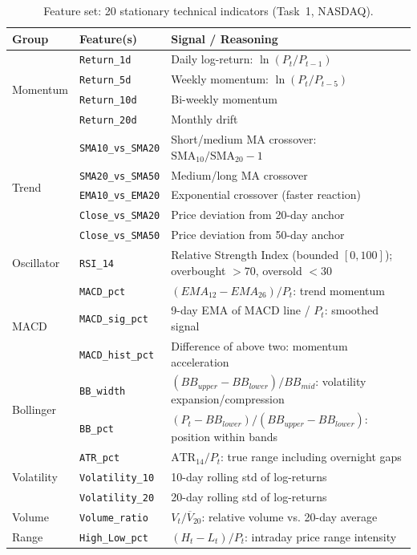 \documentclass[12pt, a4paper]{article}
\begin{document}
\begin{table}[h]
\centering
\caption{Feature set: 20 stationary technical indicators (Task~1, NASDAQ).}
\label{tab:features}
\renewcommand{\arraystretch}{1.3}
\begin{tabular}{llp{6cm}}
\hline
\textbf{Group} & \textbf{Feature(s)} & \textbf{Signal / Reasoning} \\
\hline
\multirow{4}{*}{Momentum}
  & \texttt{Return\_1d}  & Daily log-return: $\ln(P_t / P_{t-1})$ \\
  & \texttt{Return\_5d}  & Weekly momentum: $\ln(P_t / P_{t-5})$ \\
  & \texttt{Return\_10d} & Bi-weekly momentum \\
  & \texttt{Return\_20d} & Monthly drift \\
\hline
\multirow{5}{*}{Trend}
  & \texttt{SMA10\_vs\_SMA20} & Short/medium MA crossover: $\text{SMA}_{10}/\text{SMA}_{20} - 1$ \\
  & \texttt{SMA20\_vs\_SMA50} & Medium/long MA crossover \\
  & \texttt{EMA10\_vs\_EMA20} & Exponential crossover (faster reaction) \\
  & \texttt{Close\_vs\_SMA20} & Price deviation from 20-day anchor \\
  & \texttt{Close\_vs\_SMA50} & Price deviation from 50-day anchor \\
\hline
Oscillator
  & \texttt{RSI\_14} & Relative Strength Index (bounded $[0,100]$); overbought $>70$, oversold $<30$ \\
\hline
\multirow{3}{*}{MACD}
  & \texttt{MACD\_pct}      & $(EMA_{12} - EMA_{26}) / P_t$: trend momentum \\
  & \texttt{MACD\_sig\_pct} & 9-day EMA of MACD line / $P_t$: smoothed signal \\
  & \texttt{MACD\_hist\_pct}& Difference of above two: momentum acceleration \\
\hline
\multirow{2}{*}{Bollinger}
  & \texttt{BB\_width} & $(BB_{upper} - BB_{lower}) / BB_{mid}$: volatility expansion/compression \\
  & \texttt{BB\_pct}   & $(P_t - BB_{lower}) / (BB_{upper} - BB_{lower})$: position within bands \\
\hline
\multirow{3}{*}{Volatility}
  & \texttt{ATR\_pct}       & $\text{ATR}_{14} / P_t$: true range including overnight gaps \\
  & \texttt{Volatility\_10} & 10-day rolling std of log-returns \\
  & \texttt{Volatility\_20} & 20-day rolling std of log-returns \\
\hline
Volume  & \texttt{Volume\_ratio} & $V_t / \overline{V}_{20}$: relative volume vs. 20-day average \\
\hline
Range   & \texttt{High\_Low\_pct} & $(H_t - L_t) / P_t$: intraday price range intensity \\
\hline
\end{tabular}
\end{table}
\end{document}
